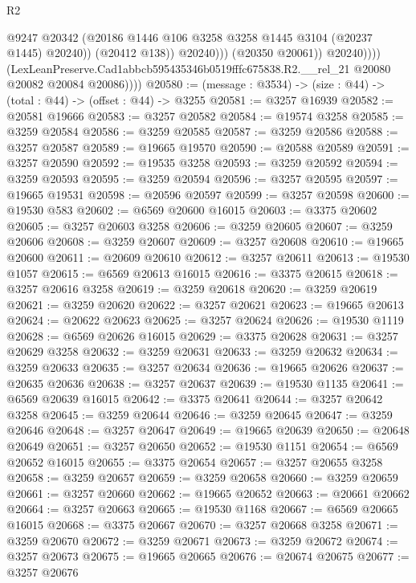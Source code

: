 \begin{lexlean}{R2}
\begin{coremodule}
                              @9247
                              @20342
                              (@20186 @1446 @106 @3258 @3258 @1445 @3104 (@20237 @1445) @20240))
                            (@20412 @138))
                          @20240)))
                    (@20350 @20061))
                  @20240))))
          (LexLeanPreserve.Cad1abbcb595435346b0519fffc675838.R2.__rel_21
            @20080
            @20082
            @20084
            @20086))))
@20580 := (message : @3534) -> (size : @44) -> (total : @44) -> (offset : @44) -> @3255
@20581 := @3257 @16939
@20582 := @20581 @19666
@20583 := @3257 @20582
@20584 := @19574 @3258
@20585 := @3259 @20584
@20586 := @3259 @20585
@20587 := @3259 @20586
@20588 := @3257 @20587
@20589 := @19665 @19570
@20590 := @20588 @20589
@20591 := @3257 @20590
@20592 := @19535 @3258
@20593 := @3259 @20592
@20594 := @3259 @20593
@20595 := @3259 @20594
@20596 := @3257 @20595
@20597 := @19665 @19531
@20598 := @20596 @20597
@20599 := @3257 @20598
@20600 := @19530 @583
@20602 := @6569 @20600 @16015
@20603 := @3375 @20602
@20605 := @3257 @20603 @3258
@20606 := @3259 @20605
@20607 := @3259 @20606
@20608 := @3259 @20607
@20609 := @3257 @20608
@20610 := @19665 @20600
@20611 := @20609 @20610
@20612 := @3257 @20611
@20613 := @19530 @1057
@20615 := @6569 @20613 @16015
@20616 := @3375 @20615
@20618 := @3257 @20616 @3258
@20619 := @3259 @20618
@20620 := @3259 @20619
@20621 := @3259 @20620
@20622 := @3257 @20621
@20623 := @19665 @20613
@20624 := @20622 @20623
@20625 := @3257 @20624
@20626 := @19530 @1119
@20628 := @6569 @20626 @16015
@20629 := @3375 @20628
@20631 := @3257 @20629 @3258
@20632 := @3259 @20631
@20633 := @3259 @20632
@20634 := @3259 @20633
@20635 := @3257 @20634
@20636 := @19665 @20626
@20637 := @20635 @20636
@20638 := @3257 @20637
@20639 := @19530 @1135
@20641 := @6569 @20639 @16015
@20642 := @3375 @20641
@20644 := @3257 @20642 @3258
@20645 := @3259 @20644
@20646 := @3259 @20645
@20647 := @3259 @20646
@20648 := @3257 @20647
@20649 := @19665 @20639
@20650 := @20648 @20649
@20651 := @3257 @20650
@20652 := @19530 @1151
@20654 := @6569 @20652 @16015
@20655 := @3375 @20654
@20657 := @3257 @20655 @3258
@20658 := @3259 @20657
@20659 := @3259 @20658
@20660 := @3259 @20659
@20661 := @3257 @20660
@20662 := @19665 @20652
@20663 := @20661 @20662
@20664 := @3257 @20663
@20665 := @19530 @1168
@20667 := @6569 @20665 @16015
@20668 := @3375 @20667
@20670 := @3257 @20668 @3258
@20671 := @3259 @20670
@20672 := @3259 @20671
@20673 := @3259 @20672
@20674 := @3257 @20673
@20675 := @19665 @20665
@20676 := @20674 @20675
@20677 := @3257 @20676

\end{coremodule}
\end{lexlean}
